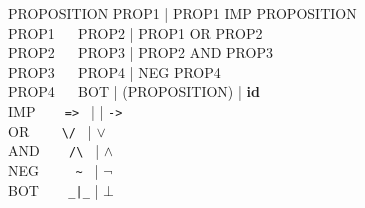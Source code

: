 \documentclass[BA.tex]{subfiles}
\begin{document}
{\ttfamily
\noindent
PROPOSITION   \tra PROP1 | PROP1 IMP PROPOSITION \\
PROP1 $~~~~~~$\tra PROP2 | PROP1 OR PROP2\\
PROP2 $~~~~~~$\tra PROP3 | PROP2 AND PROP3\\
PROP3 $~~~~~~$\tra PROP4 | NEG PROP4\\
PROP4 $~~~~~~$\tra BOT | (PROPOSITION) | {\bf id}\\
IMP $~~~~~~~~$\tra \verb+=> + | \tra | \verb+->+\\
OR $~~~~~~~~~$\tra \verb+\/ + | \(\lor\) \\
AND $~~~~~~~~$\tra \verb+/\ + | \(\land\) \\
NEG $~~~~~~~~$\tra \verb+ ~ + | \(\neg\) \\
BOT $~~~~~~~~$\tra \verb+_|_+ | \(\bot\)
}
\end{document}
